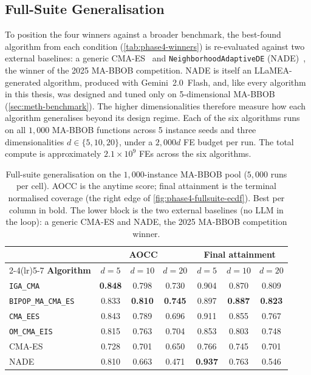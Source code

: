 \subsection{Full-Suite Generalisation}
\label{sec:results-stage4-generalisation}

To position the four winners against a broader benchmark, the best-found algorithm from each condition (\cref{tab:phase4-winners}) is re-evaluated against two external baselines: a generic CMA-ES~\cite{hansen2001cmaes} and \texttt{NeighborhoodAdaptiveDE} (NADE)~\cite{vanStein2025NeighborhoodDE}, the winner of the 2025 MA-BBOB competition. NADE is itself an LLaMEA-generated algorithm, produced with Gemini~2.0~Flash, and, like every algorithm in this thesis, was designed and tuned only on 5-dimensional MA-BBOB (\cref{sec:meth-benchmark}). The higher dimensionalities therefore measure how each algorithm generalises beyond its design regime. Each of the six algorithms runs on all $1{,}000$ MA-BBOB functions across 5 instance seeds and three dimensionalities $d \in \{5, 10, 20\}$, under a $2{,}000d$ FE budget per run. The total compute is approximately $2.1 \times 10^9$ FEs across the six algorithms.

\begin{table}[t]
\centering
\footnotesize
\caption{Full-suite generalisation on the $1{,}000$-instance MA-BBOB pool ($5{,}000$ runs per cell). AOCC is the anytime score; final attainment is the terminal normalised coverage (the right edge of \cref{fig:phase4-fullsuite-ecdf}). Best per column in bold. The lower block is the two external baselines (no LLM in the loop): a generic CMA-ES and NADE, the 2025 MA-BBOB competition winner.}
\label{tab:phase4-fullsuite-summary}
\setlength{\tabcolsep}{4pt}
\begin{tabular}{@{}lcccccc@{}}
\toprule
 & \multicolumn{3}{c}{\textbf{AOCC}} & \multicolumn{3}{c}{\textbf{Final attainment}} \\
\cmidrule(lr){2-4}\cmidrule(lr){5-7}
\textbf{Algorithm} & $d{=}5$ & $d{=}10$ & $d{=}20$ & $d{=}5$ & $d{=}10$ & $d{=}20$ \\
\midrule
\texttt{IGA\_CMA}            & \textbf{0.848} & 0.798 & 0.730 & 0.904 & 0.870 & 0.809 \\
\texttt{BIPOP\_MA\_CMA\_ES}   & 0.833 & \textbf{0.810} & \textbf{0.745} & 0.897 & \textbf{0.887} & \textbf{0.823} \\
\texttt{CMA\_EES}            & 0.843 & 0.789 & 0.696 & 0.911 & 0.855 & 0.767 \\
\texttt{OM\_CMA\_EIS}         & 0.815 & 0.763 & 0.704 & 0.853 & 0.803 & 0.748 \\
\midrule
CMA-ES~\cite{hansen2001cmaes}          & 0.728 & 0.701 & 0.650 & 0.766 & 0.745 & 0.701 \\
NADE~\cite{vanStein2025NeighborhoodDE} & 0.810 & 0.663 & 0.471 & \textbf{0.937} & 0.763 & 0.546 \\
\bottomrule
\end{tabular}
\end{table}

